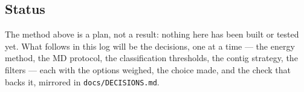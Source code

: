 \subsection{Status}
The method above is a plan, not a result: nothing here has been built or tested yet. What follows in this log will be the decisions, one at a time --- the energy method, the
MD protocol, the classification thresholds, the contig strategy, the filters --- each with the
options weighed, the choice made, and the check that backs it, mirrored in \texttt{docs/DECISIONS.md}.
